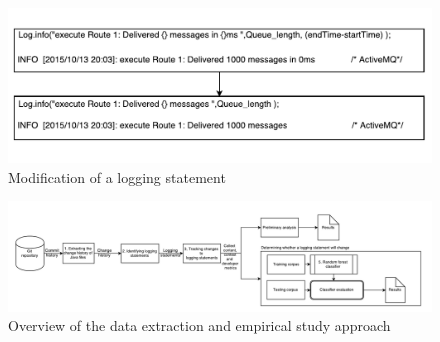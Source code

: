 \begin{figure}[t]
	\centering
	\includegraphics[width=1\columnwidth]{ExampleOfLogChange_LPA}
	\caption{Modification of a logging statement}
	\label{fig:ExampleOfLogChange_LPA}
\end{figure}

\begin{figure}[t]
	\centering

	\includegraphics[width=2\columnwidth,trim={0 0 0 1cm },clip]{LogGenalogyMethdology}



	\caption{Overview of the data extraction and empirical study approach}
	\label{fig:LGmethod}
\end{figure}



